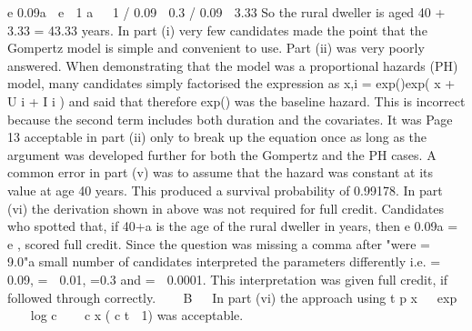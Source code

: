 e 0.09a  e  1
a   1 / 0.09  0.3 / 0.09  3.33
So the rural dweller is aged 40 + 3.33 = 43.33 years.
In part (i) very few candidates made the point that the Gompertz model is simple and
convenient to use. Part (ii) was very poorly answered. When demonstrating that the model
was a proportional hazards (PH) model, many candidates simply factorised the expression as
\mu x,i = exp(\alpha)exp( x +  U i +  I i ) and said that therefore exp(\alpha) was the baseline hazard.
This is incorrect because the second term includes both duration and the covariates. It was
Page 13%
acceptable in part (ii) only to break up the equation once as long as the argument was
developed further for both the Gompertz and the PH cases. A common error in part (v) was
to assume that the hazard was constant at its value at age 40 years. This produced a survival
probability of 0.99178. In part (vi) the derivation shown in above was not required for full
credit. Candidates who spotted that, if 40+a is the age of the rural dweller in years,
then e 0.09a = e  , scored full credit.
Since the question was missing a comma after "were \alpha =  9.0"a small number of candidates
interpreted the parameters differently i.e. \alpha = 0.09,  =  0.01,  =0.3 and  =  0.0001.
This interpretation was given full credit, if followed through correctly.

  B  
In part (vi) the approach using t p x   exp 
 
 log c  

c x ( c t  1)
was acceptable.
